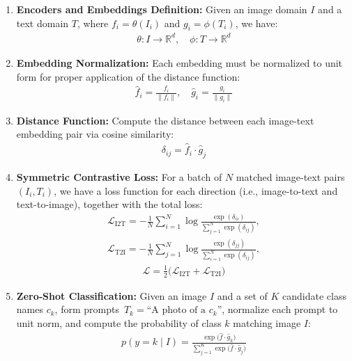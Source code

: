 \begin{enumerate}
  \item \textbf{Encoders and Embeddings Definition:}
  Given an image domain \(I\) and a text domain \(T\), where \(f_i = \theta(I_i)\) and \(g_i = \phi(T_i)\), we have:
  \begin{align}
      \theta : I \to \mathbb{R}^d,\quad
      \phi : T \to \mathbb{R}^d
  \end{align}

  \item \textbf{Embedding Normalization:}
  Each embedding must be normalized to unit form for proper application of the distance function:
  \begin{align}\label{eq:embedding_normalization}
      \hat f_i = \frac{f_i}{\lVert f_i\rVert},\quad
      \hat g_i = \frac{g_i}{\lVert g_i\rVert}
  \end{align}

  \item \textbf{Distance Function:}
    Compute the distance between each image-text embedding pair via cosine similarity:
    \begin{align}\label{eq:cosine_similarity}
      \delta_{ij} = \hat f_i \cdot \hat g_j
    \end{align}

  \item \textbf{Symmetric Contrastive Loss:}
    For a batch of \(N\) matched image-text pairs \((I_i,T_i)\), we have a loss function for each direction (i.e., image-to-text and text-to-image), together with the total loss:
    \begin{align}
      \mathcal{L}_{\mathrm{I2T}} = -\frac{1}{N}\sum_{i=1}^N
      \log\frac{\exp(\delta_{ii})}{\sum_{j=1}^N \exp(\delta_{ij})},
    \end{align}
    \begin{align}
      \mathcal{L}_{\mathrm{T2I}} = -\frac{1}{N}\sum_{j=1}^N
      \log\frac{\exp(\delta_{jj})}{\sum_{i=1}^N \exp(\delta_{ij})},
    \end{align}
    \begin{align}
      \mathcal{L} = \frac{1}{2}\bigl(\mathcal{L}_{\mathrm{I2T}} + \mathcal{L}_{\mathrm{T2I}}\bigr)
    \end{align}

  \item \textbf{Zero‑Shot Classification:}
    Given an image \(I\) and a set of \(K\) candidate class names \(c_k\), form prompts
    \(\,T_k = \text{“A photo of a }c_k\text{”}\), normalize each prompt to unit norm, and compute the probability of class \(k\) matching image \(I\):
    \begin{align}
      p(y=k\mid I) = \frac{\exp\bigl(\hat f\cdot \hat g_k)}{\sum_{j=1}^K \exp\bigl(\hat f\cdot \hat g_j)}
    \end{align}
\end{enumerate}

